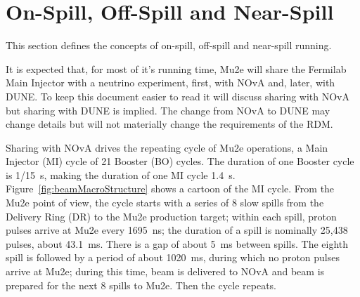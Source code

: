 \section{On-Spill, Off-Spill and Near-Spill}

This section defines the concepts of on-spill, off-spill and near-spill running.

It is expected that, for most of it's running time,
Mu2e will share the Fermilab Main Injector with a neutrino experiment,
first, with NOvA and, later, with DUNE.
To keep this document easier to read it will discuss sharing with NOvA but sharing with DUNE is implied.
The change from NOvA to DUNE may change details
but will not materially change the requirements of the RDM.

Sharing with NOvA drives the repeating cycle of Mu2e operations, a Main Injector (MI) cycle of
21 Booster (BO) cycles.
The duration of one Booster cycle is 1/15~s,
making the duration of one MI cycle 1.4~s.
Figure~\ref{fig:beamMacroStructure} shows a cartoon of the MI cycle.
From the Mu2e point of view, the cycle starts with a series of 8 slow spills
from the Delivery Ring (DR) to the Mu2e production target;
within each spill, proton pulses arrive at Mu2e every 1695~ns;
the duration of a spill is nominally 25,438 pulses, about 43.1~ms.
There is a gap of about 5~ms between spills.
The eighth spill is followed by a period of about 1020~ms,
during which no proton pulses arrive at Mu2e;
during this time, beam is delivered to NOvA
and beam is prepared for the next 8 spills to Mu2e.
Then the cycle repeats.

